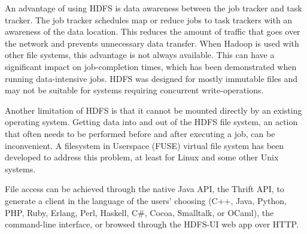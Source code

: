 \documentclass[conference]{IEEEtran}
\begin{document}
\begin{enumerate}
\par An advantage of using HDFS is data awareness between the job tracker and task tracker. The job tracker schedules map or reduce jobs to task trackers with an awareness of the data location.
This reduces the amount of traffic that goes over the network and prevents unnecessary data transfer. When Hadoop is used with other file systems, this advantage is not always available. This can have a significant impact on job-completion times, which has been demonstrated when running data-intensive jobs. HDFS was designed for mostly immutable files and may not be suitable for systems requiring concurrent write-operations.
\par Another limitation of HDFS is that it cannot be mounted directly by an existing operating system. Getting data into and out of the HDFS file system, an action that often needs to be performed before and after executing a job, can be inconvenient. A filesystem in Userspace (FUSE) virtual file system has been developed to address this problem, at least for Linux and some other Unix systems.
\par File access can be achieved through the native Java API, the Thrift API, to generate a client in the language of the users' choosing (C++, Java, Python, PHP, Ruby, Erlang, Perl, Haskell, C\#, Cocoa, Smalltalk, or OCaml), the command-line interface, or browsed through the HDFS-UI web app over HTTP.


\end{enumerate}
\end{document}
